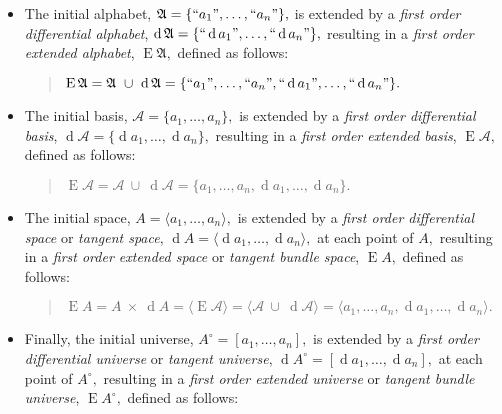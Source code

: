 \documentclass[12pt]{article}
\begin{document}
\begin{itemize}

\item
The initial alphabet, $\mathfrak{A} = \{ ``a_1", \ldots, ``a_n" \},$ is extended by a \textit{first order differential alphabet}, $\operatorname{d}\mathfrak{A} = \{ ``\operatorname{d}a_1", \ldots, ``\operatorname{d}a_n" \},$ resulting in a \textit{first order extended alphabet}, $\operatorname{E}\mathfrak{A},$ defined as follows:

\begin{quote}
$\operatorname{E}\mathfrak{A} = \mathfrak{A}\ \cup\ \operatorname{d}\mathfrak{A} = \{ ``a_1", \ldots, ``a_n", ``\operatorname{d}a_1", \ldots, ``\operatorname{d}a_n" \}.$
\end{quote}

\item
The initial basis, $\mathcal{A} = \{ a_1, \ldots, a_n \},$ is extended by a \textit{first order differential basis}, $\operatorname{d}\mathcal{A} = \{ \operatorname{d}a_1, \ldots, \operatorname{d}a_n \},$ resulting in a \textit{first order extended basis}, $\operatorname{E}\mathcal{A},$ defined as follows:

\begin{quote}
$\operatorname{E}\mathcal{A} = \mathcal{A}\ \cup\ \operatorname{d}\mathcal{A} = \{ a_1, \ldots, a_n, \operatorname{d}a_1, \ldots, \operatorname{d}a_n \}.$
\end{quote}

\item
The initial space, $A = \langle a_1, \ldots, a_n \rangle,$ is extended by a \textit{first order differential space} or \textit{tangent space}, $\operatorname{d}A = \langle \operatorname{d}a_1, \ldots, \operatorname{d}a_n \rangle,$ at each point of $A,$ resulting in a \textit{first order extended space} or \textit{tangent bundle space}, $\operatorname{E}A,$ defined as follows:

\begin{quote}
$\operatorname{E}A = A\ \times\ \operatorname{d}A = \langle \operatorname{E}\mathcal{A} \rangle = \langle \mathcal{A}\ \cup\ \operatorname{d}\mathcal{A} \rangle = \langle a_1, \ldots, a_n, \operatorname{d}a_1, \ldots, \operatorname{d}a_n \rangle.$
\end{quote}

\item
Finally, the initial universe, $A^\circ = [ a_1, \ldots, a_n ],$ is extended by a \textit{first order differential universe} or \textit{tangent universe}, $\operatorname{d}A^\circ = [ \operatorname{d}a_1, \ldots, \operatorname{d}a_n ],$ at each point of $A^\circ,$ resulting in a \textit{first order extended universe} or \textit{tangent bundle universe}, $\operatorname{E}A^\circ,$ defined as follows:


\end{itemize}
\end{document}
